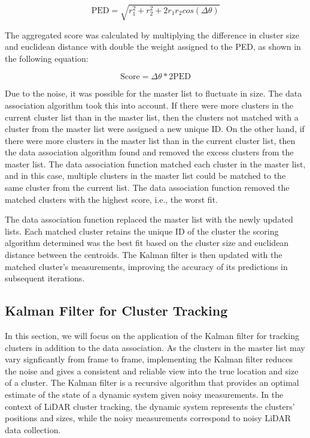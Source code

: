 \documentclass[journal]{IEEEtran} %
\begin{document}
\[
\text{PED} = \sqrt{r_1^2 + r_2^2+2r_1r_2cos(\Delta\theta)}
\]

The aggregated score was calculated by multiplying the difference in cluster size and euclidean distance with double the weight assigned to the PED, as shown in the following equation:

\[ 
\text{Score} = \Delta \theta * 2  \text{PED}
\]

Due to the noise, it was possible for the master list to fluctuate in size. The data association algorithm took this into account. If there were more clusters in the current cluster list than in the master list, then the clusters not matched with a cluster from the master list were assigned a new unique ID. On the other hand, if there were more clusters in the master list than in the current cluster list, then the data association algorithm found and removed the excess clusters from the master list. The data association function matched each cluster in the master list, and in this case, multiple clusters in the master list could be matched to the same cluster from the current list. The data association function removed the matched clusters with the highest score, i.e., the worst fit.

The data association function replaced the master list with the newly updated lists. Each matched cluster retains the unique ID of the cluster the scoring algorithm determined was the best fit based on the cluster size and euclidean distance between the centroids. The Kalman filter is then updated with the matched cluster's measurements, improving the accuracy of its predictions in subsequent iterations.


\subsection{Kalman Filter for Cluster Tracking}

In this section, we will focus on the application of the Kalman filter for tracking clusters in addition to the data association. As the clusters in the master list may vary signficantly from frame to frame, implementing the Kalman filter reduces the noise and gives a consistent and reliable view into the true location and size of a cluster. The Kalman filter is a recursive algorithm that provides an optimal estimate of the state of a dynamic system given noisy measurements. In the context of LiDAR cluster tracking, the dynamic system represents the clusters' positions and sizes, while the noisy measurements correspond to noisy LiDAR data collection.
\end{document}
